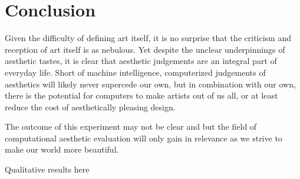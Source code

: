 \documentclass[midd]{thesis}
\begin{document}
\chapter{Conclusion}

Given the difficulty of defining art itself, it is no surprise that the criticism and reception of art itself is as nebulous. Yet despite the unclear underpinnings of aesthetic tastes, it is clear that aesthetic judgements are an integral part of everyday life. Short of machine intelligence, computerized judgements of aesthetics will likely never supercede our own, but in combination with our own, there is the potential for computers to make artists out of us all, or at least reduce the cost of aesthetically pleasing design.

The outcome of this experiment may not be clear and but the field of computational aesthetic evaluation will only gain in relevance as we strive to make our world more beautiful.


Qualitative results here



\cite{takagi, galanter-1, galanter-2, galanter-3}
\end{document}
